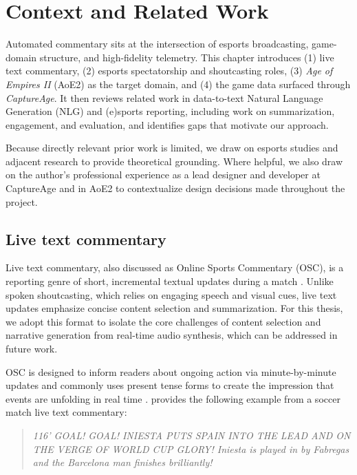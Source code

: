 \chapter{Context and Related Work}\label{chap:background}\label{chap:related}
Automated commentary sits at the intersection of esports broadcasting, game-domain structure, and high-fidelity telemetry. This chapter introduces (1) live text commentary, (2) esports spectatorship and shoutcasting roles, (3) \textit{Age of Empires II} (AoE2) as the target domain, and (4) the game data surfaced through \textit{CaptureAge}. It then reviews related work in data-to-text Natural Language Generation (NLG) and (e)sports reporting, including work on summarization, engagement, and evaluation, and identifies gaps that motivate our approach.

Because directly relevant prior work is limited, we draw on esports studies and adjacent research to provide theoretical grounding. Where helpful, we also draw on the author's professional experience as a lead designer and developer at CaptureAge and in AoE2 to contextualize design decisions made throughout the project.

\section{Live text commentary}
\label{sec:live-text-commentary}
Live text commentary, also discussed as Online Sports Commentary (OSC), is a reporting genre of short, incremental textual updates during a match \cite{pavzanin2022, lewandowski2012}. Unlike spoken shoutcasting, which relies on engaging speech and visual cues, live text updates emphasize concise content selection and summarization. For this thesis, we adopt this format to isolate the core challenges of content selection and narrative generation from real-time audio synthesis, which can be addressed in future work.

OSC is designed to inform readers about ongoing action via minute-by-minute updates and commonly uses present tense forms to create the impression that events are unfolding in real time \cite{lewandowski2012}. \citet{lewandowski2012} provides the following example from a soccer match live text commentary:

\begin{quote}\itshape
  116’ GOAL! GOAL! INIESTA PUTS SPAIN INTO THE LEAD AND ON THE VERGE OF WORLD CUP GLORY! Iniesta is played in by Fabregas and the Barcelona man finishes brilliantly!
\end{quote}

